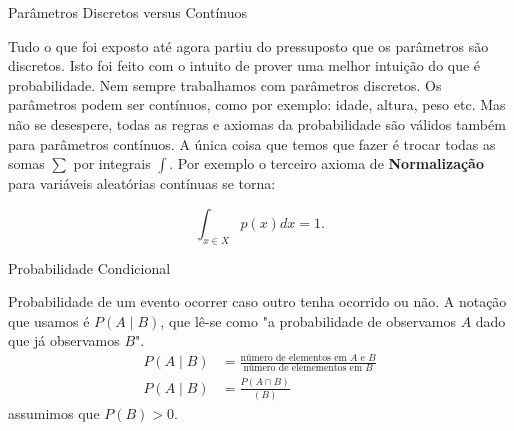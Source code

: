 \begin{frame}{Parâmetros Discretos versus Contínuos}

    Tudo o que foi exposto até agora partiu do pressuposto que os parâmetros
    são discretos. Isto foi feito com o intuito de prover uma melhor intuição
    do que é probabilidade. Nem sempre trabalhamos com parâmetros discretos.
    Os parâmetros podem ser contínuos, como por exemplo: idade, altura, peso etc.
    Mas não se desespere, todas as regras e axiomas da probabilidade são válidos
    também para parâmetros contínuos. A única coisa que temos que fazer é trocar
    todas as somas $\sum$ por integrais $\int$. Por exemplo o terceiro axioma de
    \textbf{Normalização} para variáveis aleatórias contínuas se torna:

    $$
    \int_{x \in X} p(x) dx = 1.
    $$

\end{frame}


\begin{frame}{Probabilidade Condicional}
    \begin{defn}
        Probabilidade de um evento ocorrer caso outro tenha ocorrido ou não. \newline \newline
        A notação que usamos é $P( A \mid B )$, que lê-se como "a probabilidade
        de observamos $A$ dado que já observamos $B$". \newline \newline
    \vfill \vfill
    $$
            \begin{aligned}
                P(A \mid B) &= \frac{\text{número de elementos em $A$ e $B$}}{\text{número de elemementos em $B$}} \\
                P(A \mid B) &= \frac{P(A \cap B)}{(B)}
        \end{aligned}
    $$
        \newline \newline \hspace{0.7\textwidth}
        {\footnotesize assumimos que $P(B) > 0$}.
    \end{defn}
\end{frame}

